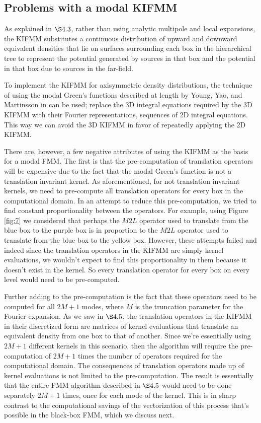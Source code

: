 \documentclass[11pt, oneside]{article}   	%
\begin{document}
\subsection{Problems with a modal KIFMM}
As explained in $\S4.3$, rather than using analytic multipole and local expansions, the KIFMM substitutes a continuous distribution of upward and downward equivalent densities that lie on surfaces surrounding each box in the hierarchical tree to represent the potential generated by sources in that box and the potential in that box due to sources in the far-field.

To implement the KIFMM for axisymmetric density distributions, the technique of using the modal Green's functions described at length by Young, Yao, and Martinsson in \cite{YYM} can be used; replace the 3D integral equations required by the 3D KIFMM with their Fourier representations, sequences of 2D integral equations. This way we can avoid the 3D KIFMM in favor of repeatedly applying the 2D KIFMM.

There are, however, a few negative attributes of using the KIFMM as the basis for a modal FMM. The first is that the pre-computation of translation operators will be expensive due to the fact that the modal Green's function is not a translation invariant kernel. As aforementioned, for not translation invariant kernels, we need to pre-compute all translation operators for every box in the computational domain. In an attempt to reduce this pre-computation, we tried to find constant proportionality between the operators. For example, using Figure \ref{fig:7} we considered that perhaps the $M2L$ operator used to translate from the blue box to the purple box is in proportion to the $M2L$ operator used to translate from the blue box to the yellow box. However, these attempts failed and indeed since the translation operators in the KIFMM are simply kernel evaluations, we wouldn't expect to find this proportionality in them because it doesn't exist in the kernel. So every translation operator for every box on every level would need to be pre-computed.

Further adding to the pre-computation is the fact that these operators need to be computed for all $2M+1$ modes, where $M$ is the truncation parameter for the Fourier expansion. As we saw in $\S4.5$, the translation operators in the KIFMM in their discretized form are matrices of kernel evaluations that translate an equivalent density from one box to that of another. Since we're essentially using $2M+1$ different kernels in this scenario, then the algorithm will require the pre-computation of $2M+1$ times the number of operators required for the computational domain. The consequences of translation operators made up of kernel evaluations is not limited to the pre-computation. The result is essentially that the entire FMM algorithm described in $\S4.5$ would need to be done separately $2M+1$ times, once for each mode of the kernel. This is in sharp contrast to the computational savings of the vectorization of this process that's possible in the black-box FMM, which we discuss next.
\end{document}
